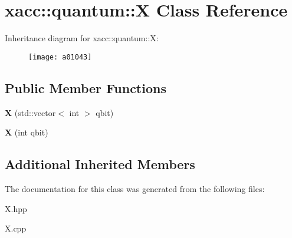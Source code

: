 \hypertarget{a01043}{}\section{xacc\+:\+:quantum\+:\+:X Class Reference}
\label{a01043}
Inheritance diagram for xacc\+:\+:quantum\+:\+:X\+:\begin{figure}[H]
\begin{center}
\leavevmode
\texttt{[image: a01043]}
\end{center}
\end{figure}
\subsection*{Public Member Functions}
\begin{DoxyCompactItemize}
\item 
\mbox{\label{a01043_aedc541a302602154847118f73b040510}} 
{\bfseries X} (std\+::vector$<$ int $>$ qbit)
\item 
\mbox{\label{a01043_a1159bd01929b59277b4524ccfcfd7440}} 
{\bfseries X} (int qbit)
\end{DoxyCompactItemize}
\subsection*{Additional Inherited Members}


The documentation for this class was generated from the following files\+:\begin{DoxyCompactItemize}
\item 
X.\+hpp\item 
X.\+cpp\end{DoxyCompactItemize}
